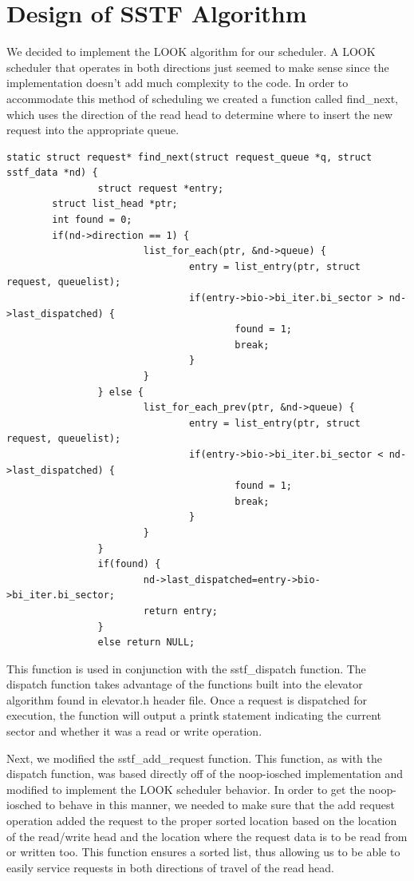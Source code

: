 \documentclass[letterpaper,10pt,draftclsnofoot,onecolumn]{IEEEtran}
\begin{document}
\section{Design of SSTF Algorithm}
We decided to implement the LOOK algorithm for our scheduler. A LOOK scheduler that operates in both directions just seemed to make sense since the implementation doesn't add much complexity to the code. In order to accommodate this method of scheduling we created a function called find\_next, which uses the direction of the read head to determine where to insert the new request into the appropriate queue.
\begin{lstlisting}
static struct request* find_next(struct request_queue *q, struct sstf_data *nd) {
                struct request *entry;
		struct list_head *ptr;
		int found = 0;
		if(nd->direction == 1) {
                        list_for_each(ptr, &nd->queue) {
                                entry = list_entry(ptr, struct request, queuelist);
                                if(entry->bio->bi_iter.bi_sector > nd->last_dispatched) {
                                        found = 1;
                                        break;
                                }
                        }
                } else {
                        list_for_each_prev(ptr, &nd->queue) {
                                entry = list_entry(ptr, struct request, queuelist);
                                if(entry->bio->bi_iter.bi_sector < nd->last_dispatched) {
                                        found = 1;
                                        break;
                                }
                        }
                }
                if(found) {
                        nd->last_dispatched=entry->bio->bi_iter.bi_sector;
                        return entry;
                }
                else return NULL;
\end{lstlisting}
This function is used in conjunction with the sstf\_dispatch function. The dispatch function takes advantage of the functions built into the elevator algorithm found in elevator.h header file. Once a request is dispatched for execution, the function will output a printk statement indicating the current sector and whether it was a read or write operation.

Next, we modified the sstf\_add\_request function. This function, as with the dispatch function, was based directly off of the noop-iosched implementation and modified to implement the LOOK scheduler behavior. In order to get the noop-iosched to behave in this manner, we needed to make sure that the add request operation added the request to the proper sorted location based on the location of the read/write head and the location where the request data is to be read from or written too. This function ensures a sorted list, thus allowing us to be able to easily service requests in both directions of travel of the read head.
\end{document}
